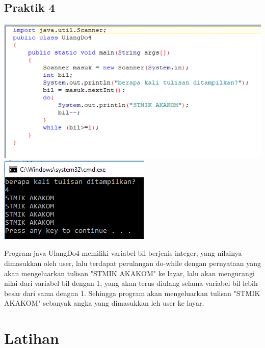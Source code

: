 \documentclass[a4paper,12pt]{article}
\begin{document}
\subsection{Praktik 4}
\begin{center}
	\includegraphics[scale=1]{Capture5}
	\includegraphics[scale=1]{Capture5_2}
\end{center}

Program java UlangDo4 memiliki variabel bil berjenis integer, yang nilainya dimasukkan oleh user, lalu terdapat perulangan do-while dengan pernyataan yang akan mengeluarkan tulisan "STMIK AKAKOM" ke layar, lalu akan mengurangi nilai dari variabel bil dengan 1, yang akan terus diulang selama variabel bil lebih besar dari sama dengan 1. Sehingga program akan mengeluarkan tulisan "STMIK AKAKOM" sebanyak angka yang  dimasukkan leh user ke layar.

\section{Latihan}
\end{document}
